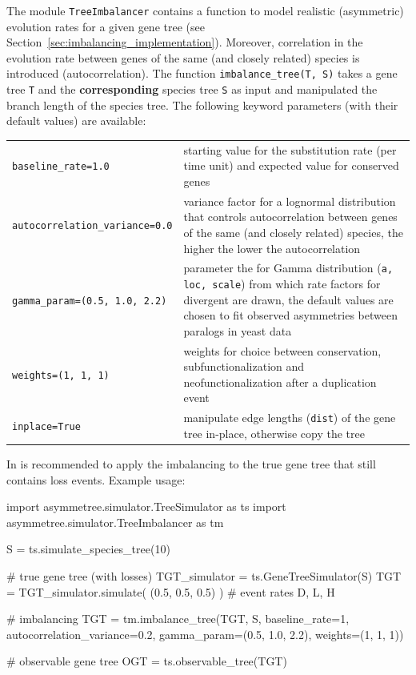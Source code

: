 \documentclass[hidelinks,11pt]{scrreprt}
\begin{document}
The module \texttt{TreeImbalancer} contains a function to model realistic (asymmetric) evolution rates for a given gene tree (see Section~\ref{sec:imbalancing_implementation}).
Moreover, correlation in the evolution rate between genes of the same (and closely related) species is introduced (autocorrelation).
The function \texttt{imbalance\_tree(T, S)} takes a gene tree \texttt{T} and the \textbf{corresponding} species tree \texttt{S} as input and manipulated the branch length of the species tree.
The following keyword parameters (with their default values) are available:

\vspace{3mm}
\renewcommand{\arraystretch}{1.5}
\begin{tabularx}{0.95\textwidth} { >{\raggedright\arraybackslash}p{5.6cm} >{\raggedright\arraybackslash}X }
	\texttt{baseline\_rate=1.0} & starting value for the substitution rate (per time unit) and expected value for conserved genes\\
	\texttt{autocorrelation\_variance=0.0}  & variance factor for a lognormal distribution that controls autocorrelation between genes of the same (and closely related) species, the higher the lower the auto\-corre\-la\-tion\\
	\texttt{gamma\_param=(0.5, 1.0, 2.2)}  & parameter the for Gamma distribution (\texttt{a, loc, scale}) from which rate factors for divergent are drawn, the default values are chosen to fit observed asymmetries between paralogs in yeast data \citep{byrne2007}\\
	\texttt{weights=(1, 1, 1)}  & weights for choice between conservation,
	subfunctionalization and neofunctionalization after a duplication event\\
	\texttt{inplace=True}  & manipulate edge lengths (\texttt{dist}) of the gene tree in-place, otherwise copy the tree\\
\end{tabularx}
\vspace{3mm}

In is recommended to apply the imbalancing to the true gene tree that still contains loss events.
Example usage:
\vspace{2mm}
\begin{python}
import asymmetree.simulator.TreeSimulator as ts
import asymmetree.simulator.TreeImbalancer as tm

S = ts.simulate_species_tree(10)

# true gene tree (with losses)
TGT_simulator = ts.GeneTreeSimulator(S)
TGT = TGT_simulator.simulate( (0.5, 0.5, 0.5) )    # event rates D, L, H

# imbalancing
TGT = tm.imbalance_tree(TGT, S, baseline_rate=1,
                        autocorrelation_variance=0.2,
                        gamma_param=(0.5, 1.0, 2.2),
                        weights=(1, 1, 1))

# observable gene tree
OGT = ts.observable_tree(TGT)
\end{python}
\vspace{2mm}
\end{document}
